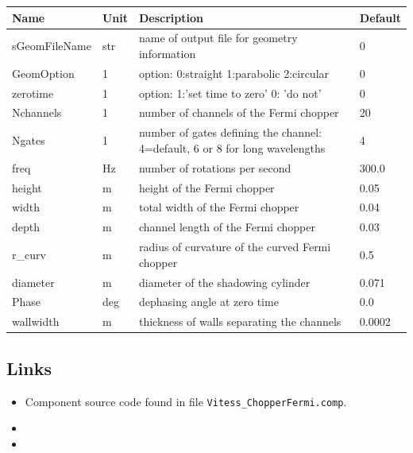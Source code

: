 \begin{longtable}{p{}p{}p{}p{}}
\toprule
\textbf{Name} & \textbf{Unit} & \textbf{Description} & \textbf{Default} \\
\midrule
\endhead
sGeomFileName & str & name of output file for geometry information & 0 \\
GeomOption & 1 & option: 0:straight 1:parabolic 2:circular & 0 \\
zerotime & 1 & option: 1:'set time to zero'  0: 'do not' & 0 \\
Nchannels & 1 & number of channels of the Fermi chopper & 20 \\
Ngates & 1 & number of gates defining the channel: 4=default, 6 or 8 for long wavelengths & 4 \\
freq & Hz & number of rotations per second & 300.0 \\
height & m & height of the Fermi chopper & 0.05 \\
width & m & total width of the Fermi chopper & 0.04 \\
depth & m & channel length of the Fermi chopper & 0.03 \\
r\_curv & m & radius of curvature of the curved Fermi chopper & 0.5 \\
diameter & m & diameter of the shadowing cylinder & 0.071 \\
Phase & deg & dephasing angle at zero time & 0.0 \\
wallwidth & m & thickness of walls separating the channels & 0.0002 \\
\bottomrule
\end{longtable}

\subsection*{Links}
\begin{itemize}
  \item Component source code found in file \texttt{Vitess\_ChopperFermi.comp}.
  \item {}
  \item {}
\end{itemize}
